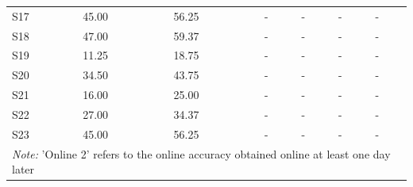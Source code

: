 \begin{table}[h]
\begin{tabular}{@{}p{1.8cm}p{2cm}p{2cm}p{2.2cm}p{2cm}p{2.2cm}p{2cm}@{}}
S17     & 45.00       & 56.25        & -             & -              & -             & - \\
S18     & 47.00       & 59.37        & -             & -              & -             & - \\
S19     & 11.25       & 18.75        & -             & -              & -             & - \\
S20     & 34.50       & 43.75        & -             & -              & -             & - \\
S21     & 16.00       & 25.00        & -             & -              & -             & - \\
S22     & 27.00       & 34.37        & -             & -              & -             & - \\
S23     & 45.00       & 56.25        & -             & -              & -             & - \\
\bottomrule

\multicolumn{7}{l}{\footnotesize\textit{Note:} 'Online 2' refers to the online accuracy obtained online at least one day later}
\end{tabular}
\end{table}


